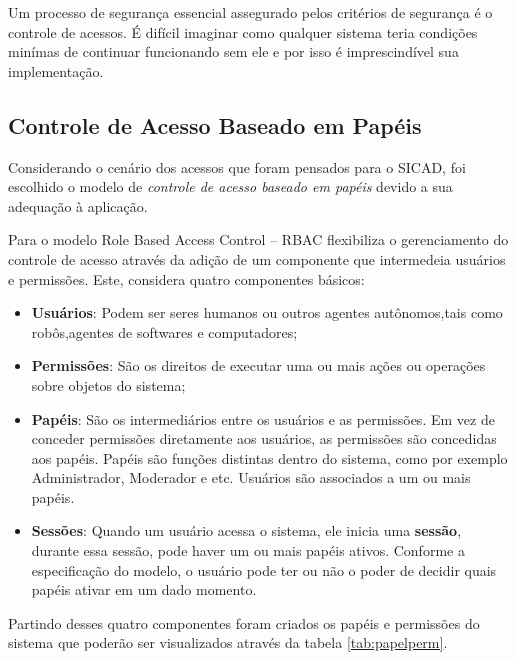 \documentclass[12pt, a4paper]{report}
\begin{document}
Um processo de segurança essencial assegurado pelos critérios de segurança é o controle de acessos. É difícil imaginar como qualquer sistema teria condições minímas de continuar funcionando sem ele e por isso é imprescindível sua implementação.

\subsection{Controle  de  Acesso  Baseado  em  Papéis }

Considerando o cenário dos acessos que foram pensados para o \ac{SICAD}, foi escolhido o modelo de \textit{controle  de  acesso  baseado  em  papéis} devido a sua adequação à aplicação.

Para \citep{sandhu1997} o modelo Role Based Access Control – RBAC flexibiliza o gerenciamento do controle de acesso através da adição de um componente que intermedeia usuários e permissões. Este, considera quatro componentes básicos:
\begin{itemize}
\item \textbf{Usuários}: Podem ser seres humanos ou outros agentes autônomos,tais como robôs,agentes de softwares e computadores;
\item \textbf{Permissões}: São os direitos de executar uma ou mais ações ou operações sobre objetos do sistema;
\item \textbf{Papéis}: São os intermediários entre os usuários e as permissões. Em vez de conceder permissões diretamente aos usuários, as permissões são concedidas aos papéis. Papéis são funções distintas dentro do sistema, como por exemplo Administrador, Moderador e etc. Usuários são associados a um ou mais papéis.  
\item \textbf{Sessões}: Quando um usuário acessa o sistema, ele inicia uma \textbf{sessão}, durante  essa  sessão, pode haver  um  ou  mais  papéis ativos. Conforme a especificação do modelo, o usuário pode ter ou não o poder de decidir quais papéis ativar em um dado momento.
\end{itemize}

Partindo desses quatro componentes foram criados os papéis e permissões do sistema que poderão ser visualizados através da tabela \ref{tab:papelperm}.
\end{document}
